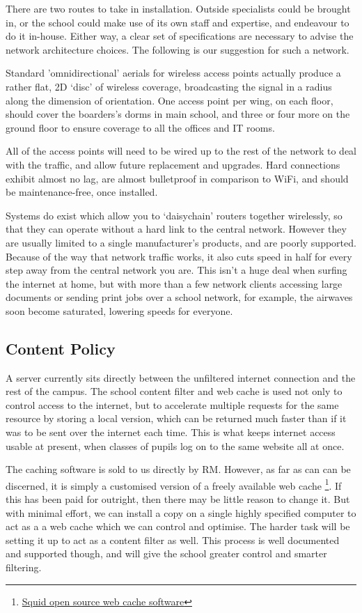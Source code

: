 \documentclass[a4paper,leqno,titlepage]{article}
\begin{document}
There are two routes to take in installation.
Outside specialists could be brought in, or the
school could make use of its own staff and expertise,
and endeavour to do it in-house.
Either way, a clear set of specifications are necessary to advise the network
architecture choices. The following is our suggestion for such a network.


Standard 'omnidirectional' aerials for wireless access points
actually produce a rather flat, 2D `disc' of wireless coverage, broadcasting
the signal in a radius along the dimension of orientation.
One access point per wing, on each floor, should cover the boarders's
dorms in main school, and three or four more on the ground floor to ensure
coverage to all the offices and IT rooms.


All of the access points will need to be wired up to the rest of the network
to deal with the traffic, and allow future replacement and upgrades.
Hard connections exhibit almost no lag, are almost bulletproof in
comparison to WiFi, and should be maintenance-free, once installed.


Systems do exist which allow you to `daisychain' routers together wirelessly,
so that they can operate without a hard link to the central network. However
they are usually limited to a single manufacturer's products,
and are poorly supported. Because of the way that network traffic works,
it also cuts speed in half for every step away from the central network you are.
This isn't a huge deal when surfing the internet at home,
but with more than a few network clients accessing large documents or sending
print jobs over a school network, for example,
the airwaves soon become saturated, lowering speeds for everyone.


\subsection{Content Policy}

A server currently sits directly between the unfiltered internet connection and
the rest of the campus. The school content filter and web cache is used not only
to control access to the internet, but to accelerate multiple requests for the
same resource by storing a local version, which can be returned much faster than
if it was to be sent over the internet each time. This is what keeps internet
access usable at present, when classes of pupils log on to the same website
all at once.


The caching software is sold to us directly by RM. However, as far as can can
be discerned, it is simply a customised version of a freely available web cache
\footnote{\href{http://en.wikipedia.org/wiki/Squid_(software)}{Squid open source web cache software}}.
If this has been paid for outright, then there
may be little reason to change it. But with minimal effort, we can install a
copy on a single highly specified computer to act as a a web cache which we
can control and optimise. The harder task will be setting it up to act as a
content filter as well. This process is well documented and supported though,
and will give the school greater control and smarter filtering.
\end{document}
